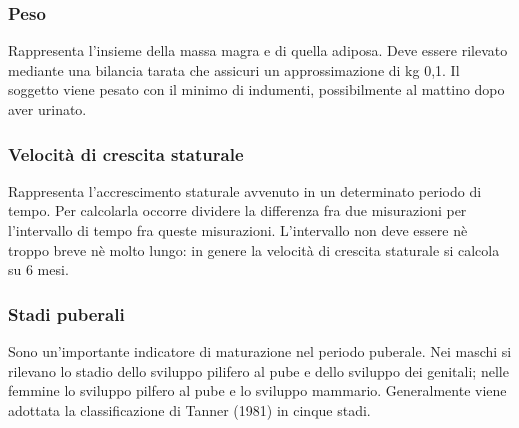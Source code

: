 \subsubsection*{Peso}
Rappresenta l'insieme della massa magra e di quella adiposa. Deve essere rilevato mediante una bilancia tarata che assicuri un approssimazione di kg 0,1. Il soggetto viene pesato con il minimo di indumenti, possibilmente al mattino dopo aver urinato.

\subsubsection*{Velocità di crescita staturale}
Rappresenta l'accrescimento staturale avvenuto in un determinato periodo di tempo. Per calcolarla occorre dividere la differenza fra due misurazioni per l'intervallo di tempo fra queste misurazioni. L'intervallo non deve essere nè troppo breve nè molto lungo: in genere la velocità di crescita staturale si calcola su 6 mesi.

\subsubsection*{Stadi puberali}
Sono un'importante indicatore di maturazione nel periodo puberale\cite{benso2001auxologia}. Nei maschi si rilevano lo stadio dello sviluppo pilifero al pube e dello sviluppo dei genitali; nelle femmine lo sviluppo pilfero al pube e lo sviluppo mammario. Generalmente viene adottata la classificazione di Tanner (1981) in cinque stadi.

